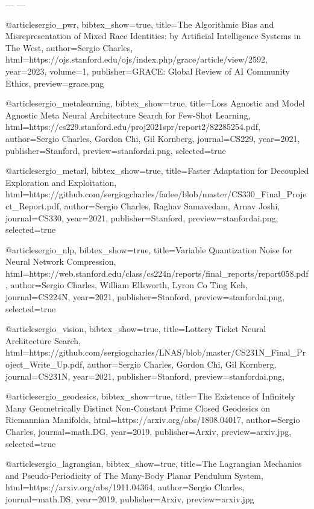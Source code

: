 ---
---


@article{sergio_pwr,
  bibtex_show={true},
  title={The Algorithmic Bias and Misrepresentation of Mixed Race Identities: by Artificial Intelligence Systems in The West},
  author={Sergio Charles},
  html={https://ojs.stanford.edu/ojs/index.php/grace/article/view/2592},
  year={2023},
  volume={1},
  publisher={GRACE: Global Review of AI Community Ethics},
  preview={grace.png}
}

@article{sergio_metalearning,
  bibtex_show={true},
  title={Loss Agnostic and Model Agnostic Meta Neural Architecture Search for Few-Shot Learning},
  html={https://cs229.stanford.edu/proj2021spr/report2/82285254.pdf},
  author={Sergio Charles, Gordon Chi, Gil Kornberg},
  journal={CS229},
  year={2021},
  publisher={Stanford},
  preview={stanfordai.png},
  selected={true}
}

@article{sergio_metarl,
  bibtex_show={true},
  title={Faster Adaptation for Decoupled Exploration and Exploitation},
  html={https://github.com/sergiogcharles/fadee/blob/master/CS330_Final_Project_Report.pdf},
  author={Sergio Charles, Raghav Samavedam, Arnav Joshi},
  journal={CS330},
  year={2021},
  publisher={Stanford},
  preview={stanfordai.png},
  selected={true}
}

@article{sergio_nlp,
  bibtex_show={true},
  title={Variable Quantization Noise for Neural Network Compression},
  html={https://web.stanford.edu/class/cs224n/reports/final_reports/report058.pdf},
  author={Sergio Charles, William Ellsworth, Lyron Co Ting Keh},
  journal={CS224N},
  year={2021},
  publisher={Stanford},
  preview={stanfordai.png},
  selected={true}
}

@article{sergio_vision,
  bibtex_show={true},
  title={Lottery Ticket Neural Architecture Search},
  html={https://github.com/sergiogcharles/LNAS/blob/master/CS231N_Final_Project_Write_Up.pdf},
  author={Sergio Charles, Gordon Chi, Gil Kornberg},
  journal={CS231N},
  year={2021},
  publisher={Stanford},
  preview={stanfordai.png},
}

@article{sergio_geodesics,
  bibtex_show={true},
  title={The Existence of Infinitely Many Geometrically Distinct Non-Constant Prime Closed Geodesics on Riemannian Manifolds},
  html={https://arxiv.org/abs/1808.04017},
  author={Sergio Charles},
  journal={math.DG},
  year={2019},
  publisher={Arxiv},
  preview={arxiv.jpg},
  selected={true}
}

@article{sergio_lagrangian,
  bibtex_show={true},
  title={The Lagrangian Mechanics and Pseudo-Periodicity of The Many-Body Planar Pendulum System},
  html={https://arxiv.org/abs/1911.04364},
  author={Sergio Charles},
  journal={math.DS},
  year={2019},
  publisher={Arxiv},
  preview={arxiv.jpg}
}

